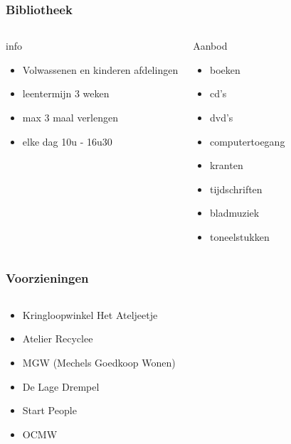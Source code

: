 \documentclass{beamer}
\begin{document}
\begin{frame}
\frametitle{Bibliotheek}
\begin{columns}
\begin{block}{info}
\begin{itemize}
\item Volwassenen en kinderen afdelingen
\item leentermijn 3 weken
\item max 3 maal verlengen
\item elke dag 10u - 16u30
\end{itemize}
\end{block}
\pause
{}
\begin{block}{Aanbod}
\begin{itemize}
\item boeken
\pause
\item cd's
\item dvd's
\pause
\item computertoegang
\pause
\item kranten
\item tijdschriften
\pause
\item bladmuziek
\item toneelstukken
\end{itemize}
\end{block}
\end{columns}
\end{frame}


\begin{frame}
\frametitle{Voorzieningen}
\begin{columns}[c]
\begin{block}{}
\begin{itemize}
\item Kringloopwinkel Het Ateljeetje
\item Atelier Recyclee
\item MGW (Mechels Goedkoop Wonen)
\item De Lage Drempel
\item Start People
\item OCMW
\end{itemize}
\end{block}
\end{columns}
\end{frame}
\end{document}
